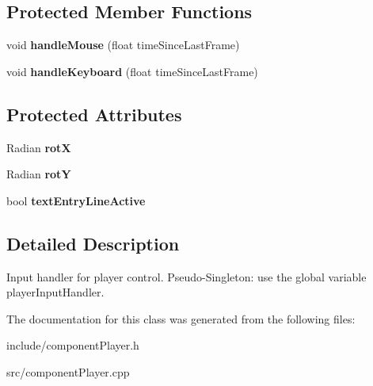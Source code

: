 \subsection*{\-Protected \-Member \-Functions}
\begin{DoxyCompactItemize}
\item 
\hypertarget{classPlayerInputHandler_a6fac2a632c6e298e8121e8b872b9c71f}{
void {\bfseries handle\-Mouse} (float time\-Since\-Last\-Frame)}
\label{db/d40/classPlayerInputHandler_a6fac2a632c6e298e8121e8b872b9c71f}

\item 
\hypertarget{classPlayerInputHandler_ae48e66c518d5cbee69546698a48049ed}{
void {\bfseries handle\-Keyboard} (float time\-Since\-Last\-Frame)}
\label{db/d40/classPlayerInputHandler_ae48e66c518d5cbee69546698a48049ed}

\end{DoxyCompactItemize}
\subsection*{\-Protected \-Attributes}
\begin{DoxyCompactItemize}
\item 
\hypertarget{classPlayerInputHandler_a5dec7946d871772783da38d39bb02a7f}{
\-Radian {\bfseries rot\-X}}
\label{db/d40/classPlayerInputHandler_a5dec7946d871772783da38d39bb02a7f}

\item 
\hypertarget{classPlayerInputHandler_abfb5a452976f9e803d176945a539b711}{
\-Radian {\bfseries rot\-Y}}
\label{db/d40/classPlayerInputHandler_abfb5a452976f9e803d176945a539b711}

\item 
\hypertarget{classPlayerInputHandler_a1a6a109b28f7cb63939b2ba7be287b8e}{
bool {\bfseries text\-Entry\-Line\-Active}}
\label{db/d40/classPlayerInputHandler_a1a6a109b28f7cb63939b2ba7be287b8e}

\end{DoxyCompactItemize}


\subsection{\-Detailed \-Description}
\-Input handler for player control. \-Pseudo-\/\-Singleton\-: use the global variable player\-Input\-Handler. 

\-The documentation for this class was generated from the following files\-:\begin{DoxyCompactItemize}
\item 
include/component\-Player.\-h\item 
src/component\-Player.\-cpp\end{DoxyCompactItemize}
